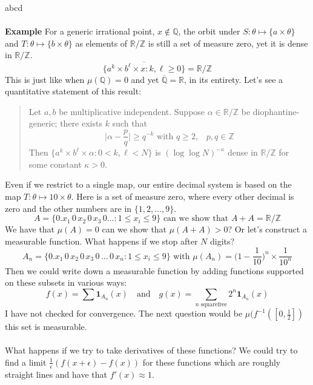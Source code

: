 \documentclass[12pt]{article}
\begin{document}
\newpage \noindent
abcd \\ \\
\textbf{Example} For a generic irrational point, $x \notin \mathbb{Q}$, the orbit under $S: \theta \mapsto \{a \times \theta\}$ and $T: \theta \mapsto \{b \times \theta\}$ as elements of $\mathbb{R}/\mathbb{Z}$ is still a set of measure zero, yet it is dense in $\mathbb{R}/\mathbb{Z}$.
$$ \overline{\{ a^k \times b^\ell \times x : k, \ell \geq 0 \}} = \mathbb{R}/\mathbb{Z} $$
This is just like when $\mu(\mathbb{Q}) = 0$ and yet $\overline{\mathbb{Q}} = \mathbb{R}$, in its entirety.  Let's see a quantitative statement of this result:
\begin{quotation}
Let $a,b$ be multiplicative independent.  Suppose $\alpha \in \mathbb{R}/\mathbb{Z}$ be diophantine-generic; there exists $k$ such that
$$ \Big|\alpha - \frac{p}{q}\Big| \geq q^{-k} \text{ with }q \geq 2,\;\;\; p, q \in \mathbb{Z} $$
Then $\{ a^k \times b^\ell \times \alpha : 0 < k, \ell < N \}$ is $(\log \log N)^{-\kappa}$ dense in $\mathbb{R}/\mathbb{Z}$ for some constant $\kappa > 0$.
\end{quotation}
Even if we restrict to a single map, our entire decimal system is based on the map $T: \theta \mapsto 10 \times \theta$.  Here is a set of measure zero, where every other decimal is zero and the other numbers are in $\{1,2,\dots, 9\}$.
$$ A = \{ 0.x_1\,0\,x_2\,0\,x_3\,0\dots : 1 \leq x_i \leq 9\} \text{ can we show that }A+A = \mathbb{R}/\mathbb{Z} $$
We have that $\mu(A) = 0$ can we show that $\mu(A+A) > 0$?  Or let's construct a measurable function.  What happens if we stop after $N$ digits?
$$ A_n = \{ 0.x_1\,0\,x_2\,0\,x_3\,0\,\dots\,0\,x_n: 1 \leq x_i \leq 9\} \text{ with }\mu(A_n) = \Big(1 - \frac{1}{10}\Big)^n \times \frac{1}{10^n} $$
Then we could write down a measurable function by adding functions supported on these subsets in various ways:
$$ f(x) = \sum \mathbf{1}_{A_n}(x) \quad\text{and}\quad g(x)= \sum_{n \text{ squarefree}} 2^n \mathbf{1}_{A_n}(x) $$ 
I have not checked for convergence.  The next question would be $\mu( f^{-1}([0,\frac{1}{2}])$ this set is measurable. \\ \\
What happens if we try to take derivatives of these functions?  We could try to find a limit $\frac{1}{\epsilon}(f(x+\epsilon) - f(x))$ for these functions which are roughly straight lines and have that $f'(x) \approx 1$.  \\ \\
\end{document}
